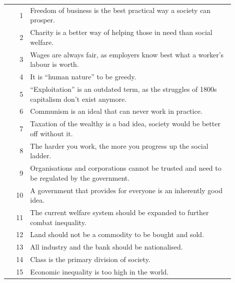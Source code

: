 \documentclass[11pt]{article}
\begin{document}
\begin{longtable}{r p{0.9\linewidth}}
\rowcolor{svEcon} 1  & Freedom of business is the best practical way a society can prosper. \\
\rowcolor{svEcon} 2  & Charity is a better way of helping those in need than social welfare. \\
\rowcolor{svEcon} 3  & Wages are always fair, as employers know best what a worker's labour is worth. \\
\rowcolor{svEcon} 4  & It is ``human nature'' to be greedy. \\
\rowcolor{svEcon} 5  & ``Exploitation'' is an outdated term, as the struggles of 1800s capitalism don't exist anymore. \\
\rowcolor{svEcon} 6  & Communism is an ideal that can never work in practice. \\
\rowcolor{svEcon} 7  & Taxation of the wealthy is a bad idea, society would be better off without it. \\
\rowcolor{svEcon} 8  & The harder you work, the more you progress up the social ladder. \\
\rowcolor{svEcon} 9  & Organisations and corporations cannot be trusted and need to be regulated by the government. \\
\rowcolor{svEcon} 10 & A government that provides for everyone is an inherently good idea. \\
\rowcolor{svEcon} 11 & The current welfare system should be expanded to further combat inequality. \\
\rowcolor{svEcon} 12 & Land should not be a commodity to be bought and sold. \\
\rowcolor{svEcon} 13 & All industry and the bank should be nationalised. \\
\rowcolor{svEcon} 14 & Class is the primary division of society. \\
\rowcolor{svEcon} 15 & Economic inequality is too high in the world. \\


\end{longtable}
\end{document}
